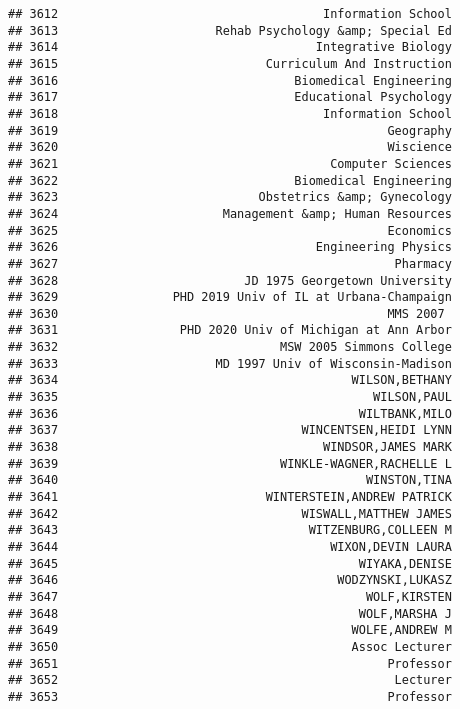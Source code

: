 \documentclass[
]{article}
\begin{document}
\begin{verbatim}
## 3612                                     Information School
## 3613                      Rehab Psychology &amp; Special Ed
## 3614                                    Integrative Biology
## 3615                             Curriculum And Instruction
## 3616                                 Biomedical Engineering
## 3617                                 Educational Psychology
## 3618                                     Information School
## 3619                                              Geography
## 3620                                              Wiscience
## 3621                                      Computer Sciences
## 3622                                 Biomedical Engineering
## 3623                            Obstetrics &amp; Gynecology
## 3624                       Management &amp; Human Resources
## 3625                                              Economics
## 3626                                    Engineering Physics
## 3627                                               Pharmacy
## 3628                          JD 1975 Georgetown University
## 3629                PHD 2019 Univ of IL at Urbana-Champaign
## 3630                                              MMS 2007 
## 3631                 PHD 2020 Univ of Michigan at Ann Arbor
## 3632                               MSW 2005 Simmons College
## 3633                      MD 1997 Univ of Wisconsin-Madison
## 3634                                         WILSON,BETHANY
## 3635                                            WILSON,PAUL
## 3636                                          WILTBANK,MILO
## 3637                                  WINCENTSEN,HEIDI LYNN
## 3638                                     WINDSOR,JAMES MARK
## 3639                               WINKLE-WAGNER,RACHELLE L
## 3640                                           WINSTON,TINA
## 3641                             WINTERSTEIN,ANDREW PATRICK
## 3642                                  WISWALL,MATTHEW JAMES
## 3643                                   WITZENBURG,COLLEEN M
## 3644                                      WIXON,DEVIN LAURA
## 3645                                          WIYAKA,DENISE
## 3646                                       WODZYNSKI,LUKASZ
## 3647                                           WOLF,KIRSTEN
## 3648                                          WOLF,MARSHA J
## 3649                                         WOLFE,ANDREW M
## 3650                                         Assoc Lecturer
## 3651                                              Professor
## 3652                                               Lecturer
## 3653                                              Professor

\end{verbatim}
\end{document}
